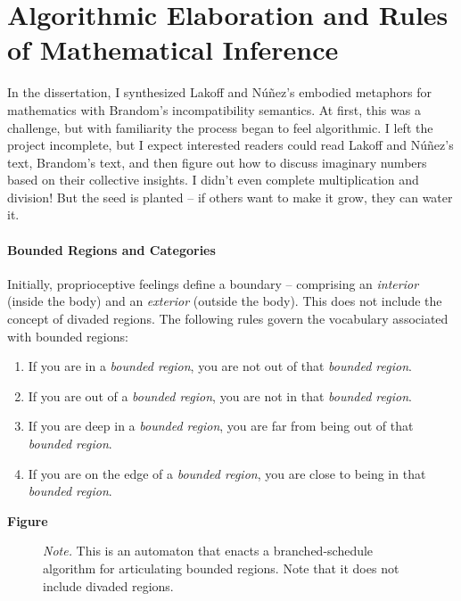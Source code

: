 \documentclass[12pt]{book}
\begin{document}
\section{Algorithmic Elaboration and Rules of Mathematical Inference}

In the dissertation, I synthesized Lakoff and Núñez's \parencite*{Lakoff2000} embodied metaphors for mathematics with Brandom's incompatibility semantics. At first, this was a challenge, but with familiarity the process began to feel algorithmic. I left the project incomplete, but I expect interested readers could read Lakoff and Núñez's text, Brandom's text, and then figure out how to discuss imaginary numbers based on their collective insights. I didn't even complete multiplication and division! But the seed is planted -- if others want to make it grow, they can water it. 

\paragraph{Bounded Regions and Categories}

Initially, proprioceptive feelings define a boundary -- comprising an \textit{interior} (inside the body) and an \textit{exterior} (outside the body). This does not include the concept of divaded regions. The following rules govern the vocabulary associated with bounded regions:

\begin{enumerate}
    \item If you are in a \textit{bounded region}, you are not out of that \textit{bounded region}.
    \item If you are out of a \textit{bounded region}, you are not in that \textit{bounded region}.
    \item If you are deep in a \textit{bounded region}, you are far from being out of that \textit{bounded region}.
    \item If you are on the edge of a \textit{bounded region}, you are close to being in that \textit{bounded region}.
\end{enumerate}



\textbf{Figure}

\begin{figure}[H]
\caption{\textit{Note. }This is an automaton that enacts a branched-schedule algorithm for articulating bounded regions. Note that it does not include divaded regions.}
\label{fig:AlgorithmForBoundedRegions}
\end{figure}
\end{document}
